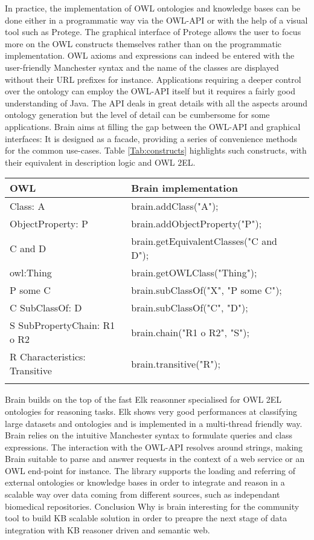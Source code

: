 \documentclass{bioinfo}
\begin{document}
In practice, the implementation of OWL ontologies and knowledge bases can be done either in a programmatic way via the OWL-API or with the
help of a visual tool such as Protege. The graphical interface of Protege allows the user to focus more on the OWL constructs themselves 
rather than on the programmatic implementation. OWL axioms and expressions can indeed be entered with the user-friendly Manchester syntax 
and the name of the classes are displayed without their URL prefixes for instance. Applications requiring a deeper control over the ontology
can employ the OWL-API itself but it requires a fairly good understanding of Java. The API deals in great details with all the aspects
around ontology generation but the level of detail can be cumbersome for some applications. Brain aims at filling the gap between the OWL-API
and graphical interfaces: It is designed as a facade, providing a series of convenience methods for the common
use-cases. Table \ref{Tab:constructs} highlights such constructs, with their equivalent in description logic and OWL 2EL.

\begin{table}[!h]
{\begin{tabular}{llll}\toprule
OWL & Brain implementation\\\midrule
Class: A & brain.addClass("A");\\
ObjectProperty: P & brain.addObjectProperty("P");\\
C and D & brain.getEquivalentClasses("C and D");\\
owl:Thing & brain.getOWLClass("Thing");\\
P some C & brain.subClassOf("X", "P some C");\\
C SubClassOf: D & brain.subClassOf("C", "D");\\
S SubPropertyChain: R1 o R2 & brain.chain("R1 o R2", "S");\\
R Characteristics: Transitive & brain.transitive("R");\\\botrule
\end{tabular}}{}
\end{table}

Brain builds on the top of the fast Elk reasonner specialised for OWL 2EL ontologies for reasoning tasks.
Elk shows very good performances at classifying large datasets and ontologies and is implemented in a multi-thread friendly way.
Brain relies on the intuitive Manchester syntax to formulate queries and class expressions. The interaction with the OWL-API
resolves around strings, making Brain suitable to parse and answer requests in the context of a web service or an OWL end-point for instance.
The library supports the loading and referring of external ontologies or knowledge bases in order to integrate and reason in a 
scalable way over data coming from different sources, such as independant biomedical repositories.
Conclusion
Why is brain interesting for the community
tool to build KB scalable solution in order to preapre the next stage of data integration with KB reasoner driven and semantic web.
\end{document}
